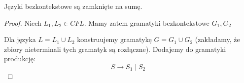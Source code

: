 \begin{theorem}
    Języki bezkontekstowe są zamknięte na sumę.
\end{theorem}
\begin{proof}
    Niech \( L_1, L_2 \in CFL \). Mamy zatem gramatyki bezkontekstowe \( G_1, G_2 \)
    
    Dla języka \( L = L_1 \cup L_2 \) konstruujemy gramatykę \( G = G_1 \cup G_2 \) (zakładamy, że zbiory nieterminali tych gramatyk są rozłączne).
    Dodajemy do gramatyki produkcję:
    \[
        S \rightarrow S_1 \mid S_2
    \]
\end{proof}